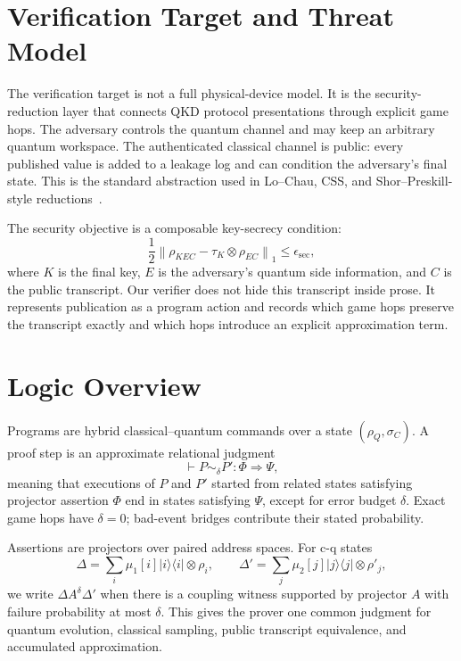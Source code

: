\section{Verification Target and Threat Model}
\label{sec:threat-model}

The verification target is not a full physical-device model. It is the security-reduction layer that connects QKD protocol presentations through explicit game hops. The adversary controls the quantum channel and may keep an arbitrary quantum workspace. The authenticated classical channel is public: every published value is added to a leakage log and can condition the adversary's final state. This is the standard abstraction used in Lo--Chau, CSS, and Shor--Preskill-style reductions~\cite{lochau1999unconditional,shor2000simple,mayers2001unconditional}.

The security objective is a composable key-secrecy condition:
\[
\frac12\left\|\rho_{KEC}-\tau_K\otimes\rho_{EC}\right\|_1
\le \epsilon_{\mathrm{sec}},
\]
where $K$ is the final key, $E$ is the adversary's quantum side information, and $C$ is the public transcript. Our verifier does not hide this transcript inside prose. It represents publication as a program action and records which game hops preserve the transcript exactly and which hops introduce an explicit approximation term.

\section{Logic Overview}
\label{sec:logic}

Programs are hybrid classical--quantum commands over a state $(\rho_Q,\sigma_C)$. A proof step is an approximate relational judgment
\[
\vdash P\sim_{\delta}P':\Phi\Longrightarrow\Psi,
\]
meaning that executions of $P$ and $P'$ started from related states satisfying projector assertion $\Phi$ end in states satisfying $\Psi$, except for error budget $\delta$. Exact game hops have $\delta=0$; bad-event bridges contribute their stated probability.

Assertions are projectors over paired address spaces. For c-q states
\[
\Delta=\sum_i \mu_1[i]|i\rangle\!\langle i|\otimes\rho_i,\qquad
\Delta'=\sum_j \mu_2[j]|j\rangle\!\langle j|\otimes\rho'_j,
\]
we write $\Delta A^\delta\Delta'$ when there is a coupling witness supported by projector $A$ with failure probability at most $\delta$. This gives the prover one common judgment for quantum evolution, classical sampling, public transcript equivalence, and accumulated approximation.

